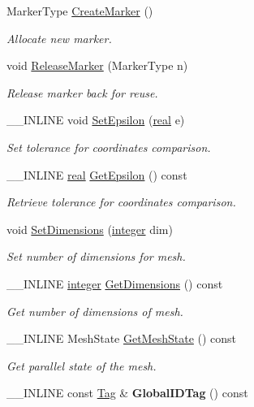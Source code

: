 \begin{DoxyCompactItemize}
\item 
Marker\-Type \hyperlink{classINMOST_1_1Mesh_a3d860dda768f1d8b7a1b5cd2066cb504}{Create\-Marker} ()
\begin{DoxyCompactList}\small\item\em Allocate new marker. \end{DoxyCompactList}\item 
void \hyperlink{classINMOST_1_1Mesh_a0872520e92d5fefcb827b239d23e4229}{Release\-Marker} (Marker\-Type n)
\begin{DoxyCompactList}\small\item\em Release marker back for reuse. \end{DoxyCompactList}\item 
\-\_\-\-\_\-\-I\-N\-L\-I\-N\-E void \hyperlink{classINMOST_1_1Mesh_a8ef41098a12fe80cac6f45ee94ef892b}{Set\-Epsilon} (\hyperlink{classINMOST_1_1Storage_a853346784b4a5822a7fac54d8f10f805}{real} e)
\begin{DoxyCompactList}\small\item\em Set tolerance for coordinates comparison. \end{DoxyCompactList}\item 
\-\_\-\-\_\-\-I\-N\-L\-I\-N\-E \hyperlink{classINMOST_1_1Storage_a853346784b4a5822a7fac54d8f10f805}{real} \hyperlink{classINMOST_1_1Mesh_a3651c7afd0489bd19eb83554b63d3a31}{Get\-Epsilon} () const 
\begin{DoxyCompactList}\small\item\em Retrieve tolerance for coordinates comparison. \end{DoxyCompactList}\item 
void \hyperlink{classINMOST_1_1Mesh_a04a2c4cb85d29a3f8bae803b013a52c9}{Set\-Dimensions} (\hyperlink{classINMOST_1_1Storage_aec96942bc647417a801e2895b45964d2}{integer} dim)
\begin{DoxyCompactList}\small\item\em Set number of dimensions for mesh. \end{DoxyCompactList}\item 
\-\_\-\-\_\-\-I\-N\-L\-I\-N\-E \hyperlink{classINMOST_1_1Storage_aec96942bc647417a801e2895b45964d2}{integer} \hyperlink{classINMOST_1_1Mesh_ae7b7567174f1da1fe8317eb8bb1fdc6c}{Get\-Dimensions} () const 
\begin{DoxyCompactList}\small\item\em Get number of dimensions of mesh. \end{DoxyCompactList}\item 
\-\_\-\-\_\-\-I\-N\-L\-I\-N\-E Mesh\-State \hyperlink{classINMOST_1_1Mesh_a8f707f8ed964b9ff6e143a625e193823}{Get\-Mesh\-State} () const 
\begin{DoxyCompactList}\small\item\em Get parallel state of the mesh. \end{DoxyCompactList}\item 
\hypertarget{classINMOST_1_1Mesh_a6b425c08bb3751726402817023c52aef}{\-\_\-\-\_\-\-I\-N\-L\-I\-N\-E const \hyperlink{classINMOST_1_1Tag}{Tag} \& {\bfseries Global\-I\-D\-Tag} () const }\label{classINMOST_1_1Mesh_a6b425c08bb3751726402817023c52aef}


\end{DoxyCompactItemize}
